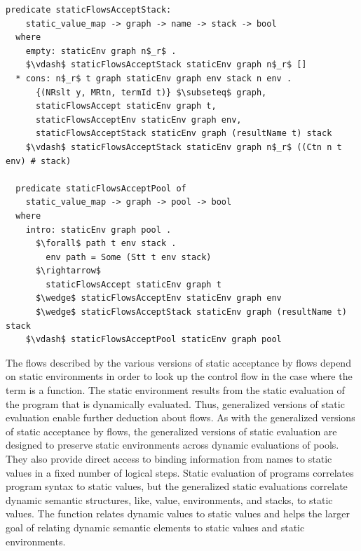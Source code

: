 \documentclass[letterpaper, 11pt]{extarticle}
\begin{document}
\begin{lstlisting}[language=logic, mathescape]
  predicate staticFlowsAcceptStack:
    static_value_map -> graph -> name -> stack -> bool
  where
    empty: staticEnv graph n$_r$ .
    $\vdash$ staticFlowsAcceptStack staticEnv graph n$_r$ []
  * cons: n$_r$ t graph staticEnv graph env stack n env .
      {(NRslt y, MRtn, termId t)} $\subseteq$ graph,
      staticFlowsAccept staticEnv graph t,
      staticFlowsAcceptEnv staticEnv graph env,
      staticFlowsAcceptStack staticEnv graph (resultName t) stack 
    $\vdash$ staticFlowsAcceptStack staticEnv graph n$_r$ ((Ctn n t env) # stack)

  predicate staticFlowsAcceptPool of
    static_value_map -> graph -> pool -> bool
  where
    intro: staticEnv graph pool .
      $\forall$ path t env stack .
        env path = Some (Stt t env stack)
      $\rightarrow$
        staticFlowsAccept staticEnv graph t
      $\wedge$ staticFlowsAcceptEnv staticEnv graph env
      $\wedge$ staticFlowsAcceptStack staticEnv graph (resultName t) stack
    $\vdash$ staticFlowsAcceptPool staticEnv graph pool
\end{lstlisting}

The flows described by the various versions of static acceptance by flows depend on static
environments in order to look up the control flow in the case where the term is a function.
The static environment
results from the static evaluation of the program that is dynamically evaluated. Thus,
generalized
versions of static evaluation enable further deduction about flows.
As with the generalized versions of static acceptance by flows,
the generalized versions of static evaluation are designed to
preserve static environments across
dynamic evaluations of pools. They also provide direct access to binding information from names
to static values in a fixed number of logical steps. Static evaluation of programs correlates
program syntax to static values, but the generalized static evaluations correlate dynamic
semantic structures, like, value, environments, and stacks, to static values. The function
relates dynamic values to static values and helps the larger goal of relating dynamic
semantic elements to static values and static environments.    
\end{document}
